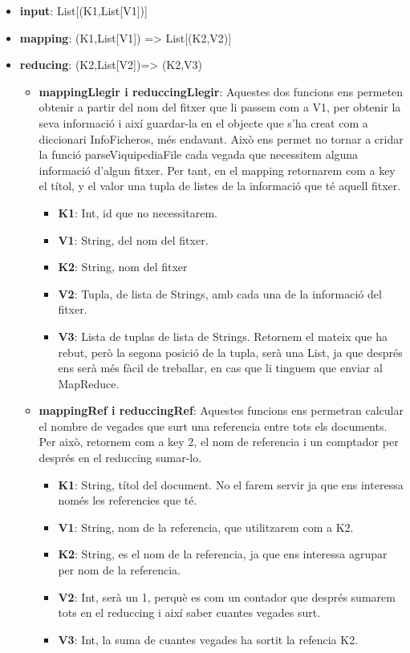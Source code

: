 \documentclass[11pt,a4paper]{article}
\begin{document}
	\begin{itemize}
		\item \textbf{input}:  List[(K1,List[V1])]
		\item \textbf{mapping}: (K1,List[V1]) => List[(K2,V2)]
		\item \textbf{reducing}: (K2,List[V2])=> (K2,V3)
		
		\begin{itemize}
		
			\item \textbf{mappingLlegir i reduccingLlegir}:
			Aquestes dos funcions ens permeten obtenir a partir del nom del fitxer que li passem com a V1, per obtenir la seva informació i així guardar-la en el objecte que s'ha creat com a diccionari InfoFicheros, més endavant. Això ens permet no tornar a cridar la funció parseViquipediaFile cada vegada que necessitem alguna informació d’algun fitxer. Per tant, en el mapping retornarem com a key el títol, y el valor una tupla de listes de la informació que té aquell fitxer.
			\begin{itemize}
				\item \textbf{K1}: Int, id que no necessitarem.
				\item \textbf{V1}: String, del nom del fitxer.
				\item \textbf{K2}: String, nom del fitxer
				\item \textbf{V2}: Tupla, de lista de Strings, amb cada una de la informació del fitxer.
				\item \textbf{V3}: Lista de tuplas de lista de Strings. Retornem el mateix que ha rebut, però la segona posició de la tupla, serà una List, ja que després ens serà més fàcil de treballar, en cas que li tinguem que enviar al MapReduce.
			\end{itemize}
			
			\item \textbf{mappingRef i reduccingRef}:
Aquestes funcions ens permetran calcular el nombre de vegades que surt una referencia entre tots els documents. Per això, retornem com a key 2, el nom de referencia i un comptador per després en el reduccing sumar-lo.
			\begin{itemize}
				\item \textbf{K1}: String, títol del document. No el farem servir ja que ens interessa només les referencies que té.
				\item \textbf{V1}: String, nom de la referencia, que utilitzarem com a K2.
				\item \textbf{K2}: String, es el nom de la referencia, ja que ens interessa agrupar per nom de la referencia.
				\item \textbf{V2}: Int, serà un 1, perquè es com un contador que després sumarem tots en el reduccing i així saber cuantes vegades surt.
				\item \textbf{V3}: Int, la suma de cuantes vegades ha sortit la refencia K2.
			\end{itemize}
			

\end{itemize}
\end{itemize}
\end{document}
